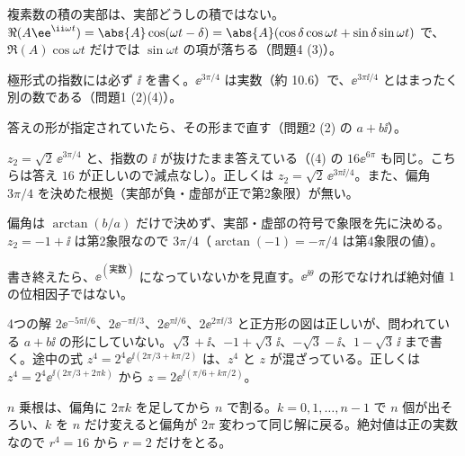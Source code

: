 \begin{daiji}
  \item 複素数の積の実部は、実部どうしの積ではない。$\Re(A\ee^{\ii\omega t})=\abs{A}\cos(\omega t-\delta)=\abs{A}(\cos\delta\cos\omega t+\sin\delta\sin\omega t)$ で、$\Re(A)\cos\omega t$ だけでは $\sin\omega t$ の項が落ちる（問題4 (3)）。
  \item 極形式の指数には必ず $\ii$ を書く。$\ee^{3\pi/4}$ は実数（約 \num{10.6}）で、$\ee^{3\pi\ii/4}$ とはまったく別の数である（問題1 (2)(4)）。
  \item 答えの形が指定されていたら、その形まで直す（問題2 (2) の $a+b\ii$）。
\end{daiji}
\begin{kotaeran}
   $z_{2}=\sqrt{2}\,\ee^{3\pi/4}$ と、指数の $\ii$ が抜けたまま答えている（(4) の $16\ee^{6\pi}$ も同じ。こちらは答え $16$ が正しいので減点なし）。正しくは $z_{2}=\sqrt{2}\,\ee^{3\pi\ii/4}$。また、偏角 $3\pi/4$ を決めた根拠（実部が負・虚部が正で第2象限）が無い。
\end{kotaeran}
\begin{rikai}
  \item 偏角は $\arctan(b/a)$ だけで決めず、実部・虚部の符号で象限を先に決める。$z_{2}=-1+\ii$ は第2象限なので $3\pi/4$（$\arctan(-1)=-\pi/4$ は第4象限の値）。
  \item 書き終えたら、$\ee^{(\text{実数})}$ になっていないかを見直す。$\ee^{\ii\theta}$ の形でなければ絶対値 $1$ の位相因子ではない。
\end{rikai}
\begin{kotaeran}
   4つの解 $2\ee^{-5\pi\ii/6}$、$2\ee^{-\pi\ii/3}$、$2\ee^{\pi\ii/6}$、$2\ee^{2\pi\ii/3}$ と正方形の図は正しいが、問われている $a+b\ii$ の形にしていない。$\sqrt{3}+\ii$、$-1+\sqrt{3}\,\ii$、$-\sqrt{3}-\ii$、$1-\sqrt{3}\,\ii$ まで書く。途中の式 $z^{4}=2^{4}\ee^{\ii(2\pi/3+k\pi/2)}$ は、$z^{4}$ と $z$ が混ざっている。正しくは $z^{4}=2^{4}\ee^{\ii(2\pi/3+2\pi k)}$ から $z=2\ee^{\ii(\pi/6+k\pi/2)}$。
\end{kotaeran}
\begin{rikai}
  \item $n$ 乗根は、偏角に $2\pi k$ を足してから $n$ で割る。$k=0,1,\ldots,n-1$ で $n$ 個が出そろい、$k$ を $n$ だけ変えると偏角が $2\pi$ 変わって同じ解に戻る。絶対値は正の実数なので $r^{4}=16$ から $r=2$ だけをとる。
\end{rikai}
